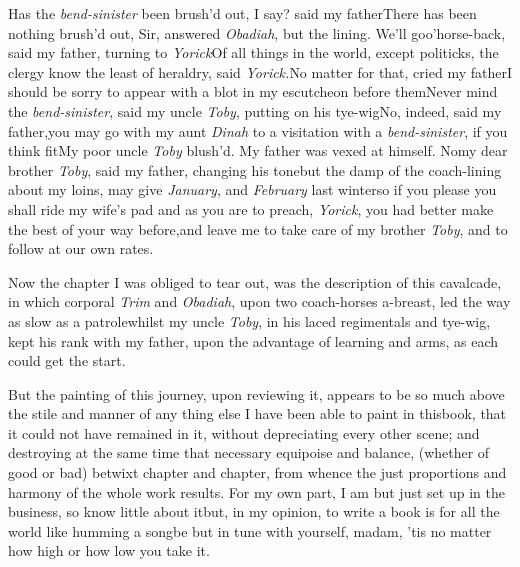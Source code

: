 \documentclass[twoside]{article}
\begin{document}
\tsk Has the \textit{bend-sinister} been brush’d out, I
say? said my father\tsk There has been nothing brush’d out, Sir, answered
\textit{Obadiah}, but the lining. We’ll go\break o’horse-back,
said my father, turning to \textit{Yorick}\tsk Of all things in the
world, except politicks, the clergy know the least of heraldry,
said \textit{Yorick.}\tsk No matter for that, cried my
father\tsk I should be sorry to appear with a blot in my
escutcheon before them\tsh Never mind the
\textit{bend-sinister}, said my uncle \textit{Toby}, putting
on his tye-wig\tsh No, indeed, said my father,\break \tsk you
may go with my aunt \textit{Dinah} to a visitation with a
\textit{bend-sinister}, if you think fit\tsk My poor uncle
\textit{Toby} blush’d. My father was vexed at himself.\tsk
No\tsk my dear brother \textit{Toby}, said my father,
changing his tone\tsk but the damp of the coach-lining about
my loins, may give  \textit{January}, and \textit{February} last
winter\tsk so if you please you shall ride my wife’s
pad\break\tsk
and as you are to preach, \textit{Yorick}, you had better
make the best of your way before,\tsk and leave me to take
care of my brother \textit{Toby}, and to follow at our\break
own rates.

Now the chapter I was obliged to tear\break
out, was the description of this cavalcade,\break
in which corporal \textit{Trim} and \textit{Obadiah},\break
upon two coach-horses a-breast, led the\break
way as slow as a patrole\tsk whilst my\break
uncle \textit{Toby}, in his laced regimentals and\break
tye-wig, kept his rank with my father,\break
{}\break
upon the advantage of learning and arms,\break
as each could get the start.


\tsk But the painting of this journey, upon reviewing it,
appears to be so much above the stile and manner of any thing else
I have been able to paint in this\break book, that it could not have
remained in it, without depreciating every other scene; and
destroying at the same time that necessary equipoise and
balance,\break
(whether of good or bad) betwixt chapter and chapter, from whence
the just proportions and harmony of the whole work results. For my
own part, I am but just set up in the business, so know little
about it\tsk but, in my opinion, to write a book is for all the
world like humming a song\tsk be but in tune with yourself,
madam, ’tis no matter how high or how low you take it.\tsk
\end{document}
